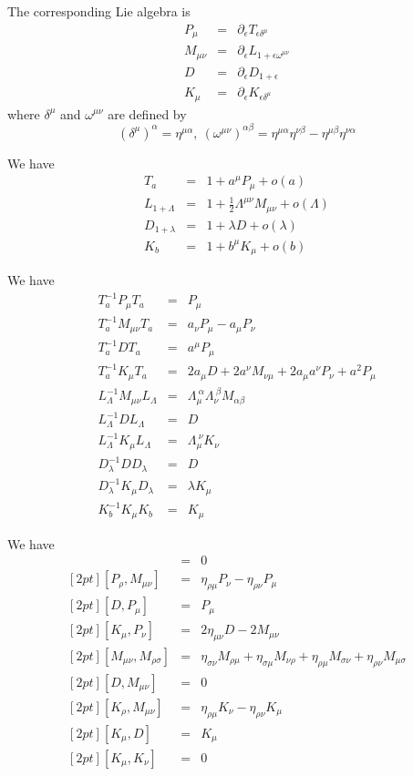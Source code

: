 \documentclass[12pt]{book}
\begin{document}
	The corresponding Lie algebra is
	\begin{eqnarray}
		P_\mu&=&\partial_\epsilon T_{\epsilon\delta^\mu}\\
		M_{\mu\nu}&=&\partial_\epsilon L_{1+\epsilon\omega^{\mu\nu}}\\
		D&=&\partial_\epsilon D_{1+\epsilon}\\
		K_\mu&=&\partial_\epsilon K_{\epsilon\delta^\mu}
	\end{eqnarray}
	where $\delta^\mu$ and $\omega^{\mu\nu}$ are defined by
	\begin{equation}
		(\delta^\mu)^\alpha=\eta^{\mu\alpha},\ (\omega^{\mu\nu})^{\alpha\beta}=\eta^{\mu\alpha}\eta^{\nu\beta}-\eta^{\mu\beta}\eta^{\nu\alpha}
	\end{equation}
	
	We have
	\begin{eqnarray}
		T_a&=&1+a^\mu P_\mu+o(a)\\
		L_{1+\Lambda}&=&1+\frac 12 \Lambda^{\mu\nu}M_{\mu\nu}+o(\Lambda)\\
		D_{1+\lambda}&=&1+\lambda D+o(\lambda)\\
		K_{b}&=&1+b^\mu K_\mu+o(b)
	\end{eqnarray}
	
	We have 
	\begin{eqnarray}
		T_{a}^{-1}P_\mu T_{a}&=&P_\mu\\
		T_a^{-1}M_{\mu\nu}T_{a}&=&a_\nu P_\mu-a_\mu P_\nu\\
		T_a^{-1}DT_{a}&=&a^\mu P_\mu\\
		T_a^{-1}K_\mu T_a&=&2a_\mu D+2a^\nu M_{\nu\mu}+2a_\mu a^\nu P_\nu+a^2P_\mu\\
		L_{\Lambda}^{-1}M_{\mu\nu}L_{\Lambda} &=&\Lambda_\mu^{\ \alpha}\Lambda_\nu^{\ \beta}M_{\alpha\beta}\\
		L_{\Lambda}^{-1}DL_{\Lambda}&=&D\\
		L_{\Lambda}^{-1}K_\mu L_{\Lambda}&=&\Lambda_\mu^{\ \nu} K_\nu\\
		D_{\lambda}^{-1}DD_{\lambda}&=&D\\
		D_{\lambda}^{-1}K_\mu D_{\lambda}&=&\lambda K_\mu\\
		K_{b}^{-1}K_\mu K_{b}&=&K_\mu
	\end{eqnarray}
	
	
	We have 
	\begin{eqnarray}
		[P_\mu,P_\nu]&=&0\\
		[2pt][P_\rho,M_{\mu\nu}]&=&\eta_{\rho\mu}P_\nu-\eta_{\rho\nu}P_\mu\\
		[2pt][D,P_\mu]&=&P_\mu\\
		[2pt][K_\mu,P_\nu]&=&2\eta_{\mu\nu}D-2M_{\mu\nu}\\
		[2pt][M_{\mu\nu},M_{\rho\sigma}]&=&\eta_{\sigma\nu}M_{\rho\mu}+\eta_{\sigma\mu}M_{\nu\rho}+\eta_{\rho\mu}M_{\sigma\nu}+\eta_{\rho\nu}M_{\mu\sigma}\\
		[2pt][D,M_{\mu\nu}]&=&0\\
		[2pt][K_\rho,M_{\mu\nu}]&=&\eta_{\rho\mu}K_\nu-\eta_{\rho\nu}K_\mu\\
		[2pt][K_\mu,D]&=&K_\mu\\
		[2pt][K_\mu,K_\nu]&=&0
	\end{eqnarray}
	
\end{document}
